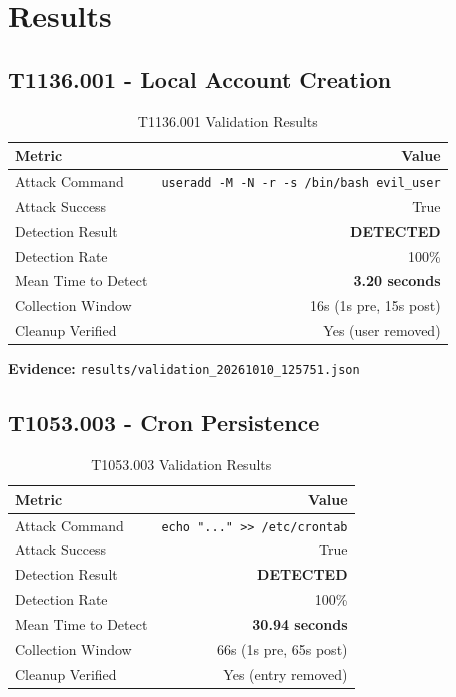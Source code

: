 \documentclass[11pt,a4paper]{article}
\begin{document}
\section{Results}

\subsection{T1136.001 - Local Account Creation}

\begin{table}[H]
    \centering
    \caption{T1136.001 Validation Results}
    \begin{tabular}{lr}
        \toprule
        \textbf{Metric} & \textbf{Value} \\
        \midrule
        Attack Command & \texttt{useradd -M -N -r -s /bin/bash evil\_user} \\
        Attack Success & True \\
        Detection Result & \textbf{DETECTED} \\
        Detection Rate & 100\% \\
        Mean Time to Detect & \textbf{3.20 seconds} \\
        Collection Window & 16s (1s pre, 15s post) \\
        Cleanup Verified & Yes (user removed) \\
        \bottomrule
    \end{tabular}
\end{table}

\textbf{Evidence:} \texttt{results/validation\_20261010\_125751.json}

\subsection{T1053.003 - Cron Persistence}

\begin{table}[H]
    \centering
    \caption{T1053.003 Validation Results}
    \begin{tabular}{lr}
        \toprule
        \textbf{Metric} & \textbf{Value} \\
        \midrule
        Attack Command & \texttt{echo "..." >> /etc/crontab} \\
        Attack Success & True \\
        Detection Result & \textbf{DETECTED} \\
        Detection Rate & 100\% \\
        Mean Time to Detect & \textbf{30.94 seconds} \\
        Collection Window & 66s (1s pre, 65s post) \\
        Cleanup Verified & Yes (entry removed) \\
        \bottomrule
    \end{tabular}
\end{table}
\end{document}
